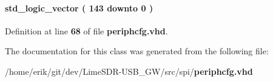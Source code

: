 \paragraph[{spi\+\_\+config\+\_\+data\+\_\+rev}]{ {\bfseries \textcolor{comment}{std\+\_\+logic\+\_\+vector}\textcolor{vhdlchar}{ }\textcolor{vhdlchar}{(}\textcolor{vhdlchar}{ }\textcolor{vhdlchar}{ } \textcolor{vhdldigit}{143} \textcolor{vhdlchar}{ }\textcolor{keywordflow}{downto}\textcolor{vhdlchar}{ }\textcolor{vhdlchar}{ } \textcolor{vhdldigit}{0} \textcolor{vhdlchar}{ }\textcolor{vhdlchar}{)}\textcolor{vhdlchar}{ }} \hspace{0.3cm}{\ttfamily [Signal]}}\label{classperiphcfg_1_1periphcfg__arch_aff1f2243afa099f0988a7ec41520f197}


Definition at line {\bf 68} of file {\bf periphcfg.\+vhd}.



The documentation for this class was generated from the following file\+:\begin{DoxyCompactItemize}
\item 
/home/erik/git/dev/\+Lime\+S\+D\+R-\/\+U\+S\+B\+\_\+\+G\+W/src/spi/{\bf periphcfg.\+vhd}\end{DoxyCompactItemize}
